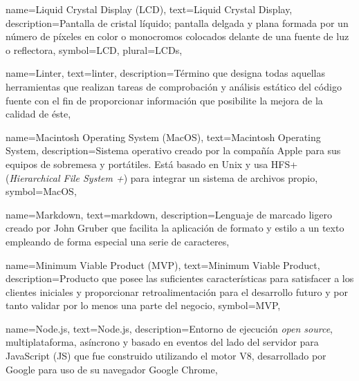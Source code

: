 {
    name={Liquid Crystal Display (LCD)},
    text={Liquid Crystal Display},
    description={Pantalla de cristal líquido; pantalla delgada y plana formada por un número de píxeles en color o monocromos colocados delante de una fuente de luz o reflectora},
    symbol={LCD},
    plural={LCDs},
}

{
    name={Linter},
    text={linter},
    description={Término que designa todas aquellas herramientas que realizan tareas de comprobación y análisis estático del código fuente con el fin de proporcionar información que posibilite la mejora de la calidad de éste},
}

{
    name={Macintosh Operating System (MacOS)},
    text={Macintosh Operating System},
    description={Sistema operativo creado por la compañía Apple para sus equipos de sobremesa y portátiles. Está basado en Unix y usa HFS+ (\textit{Hierarchical File System +}) para integrar un sistema de archivos propio},
    symbol={MacOS},
}

{
    name={Markdown},
    text={markdown},
    description={Lenguaje de marcado ligero creado por John Gruber que facilita la aplicación de formato y estilo a un texto empleando de forma especial una serie de caracteres},
}

{
    name={Minimum Viable Product (MVP)},
    text={Minimum Viable Product},
    description={Producto que posee las suficientes características para satisfacer a los clientes iniciales y proporcionar retroalimentación para el desarrollo futuro y por tanto validar por lo menos una parte del negocio},
    symbol={MVP},
}

{
    name={Node.js},
    text={Node.js},
    description={Entorno de ejecución \textit{open source}, multiplataforma, asíncrono y basado en eventos del lado del servidor para JavaScript (JS) que fue construido utilizando el motor V8, desarrollado por Google para uso de su navegador Google Chrome},
}

